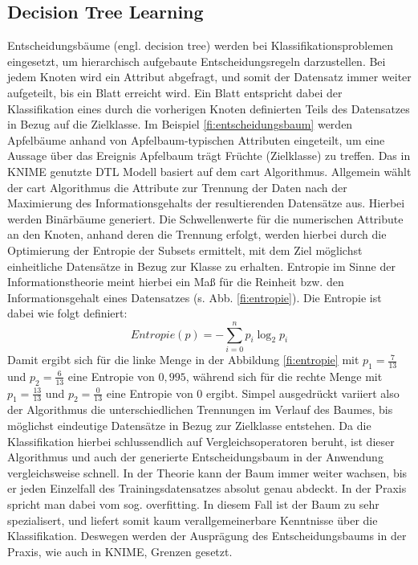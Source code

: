 \subsection{Decision Tree Learning}
\label{sec:dtl}
Entscheidungsbäume (engl. decision tree) werden bei Klassifikationsproblemen eingesetzt, um hierarchisch aufgebaute Entscheidungsregeln darzustellen. Bei jedem Knoten wird ein Attribut abgefragt, und somit der Datensatz immer weiter aufgeteilt, bis ein Blatt erreicht wird. Ein Blatt entspricht dabei der Klassifikation eines durch die vorherigen Knoten definierten Teils des Datensatzes in Bezug auf die Zielklasse. Im Beispiel \ref{fi:entscheidungsbaum} werden Apfelbäume anhand von Apfelbaum-typischen Attributen eingeteilt, um eine Aussage über das Ereignis \glqq Apfelbaum trägt Früchte\grqq{} (Zielklasse) zu treffen.\newline 
Das in \ac{KNIME} genutzte \ac{DTL} Modell basiert auf dem \ac{cart} Algorithmus. Allgemein wählt der \ac{cart} Algorithmus die Attribute zur Trennung der Daten nach der Maximierung des Informationsgehalts der resultierenden Datensätze aus. Hierbei werden Binärbäume generiert. Die Schwellenwerte für die numerischen Attribute an den Knoten, anhand deren die Trennung erfolgt, werden hierbei durch die Optimierung der Entropie der Subsets ermittelt, mit dem Ziel möglichst einheitliche Datensätze in Bezug zur Klasse zu erhalten. Entropie im Sinne der Informationstheorie meint hierbei ein Maß für die \glqq Reinheit\grqq{} bzw. den Informationsgehalt eines Datensatzes (s. Abb. \ref{fi:entropie}). Die Entropie ist dabei wie folgt definiert:
\[Entropie(p) = -\sum_{i=0}^n p_i {\log_2 p_i}\] 
Damit ergibt sich für die linke Menge in der Abbildung \ref{fi:entropie} mit $ p_1=\frac{7}{13}$ und $ p_2=\frac{6}{13}$ eine Entropie von $0,995$, während sich für die rechte Menge mit $ p_1=\frac{13}{13}$ und $ p_2=\frac{0}{13}$ eine Entropie von $0$ ergibt. Simpel ausgedrückt variiert also der Algorithmus die unterschiedlichen Trennungen im Verlauf des Baumes, bis möglichst eindeutige Datensätze in Bezug zur Zielklasse entstehen. Da die Klassifikation hierbei schlussendlich auf Vergleichsoperatoren beruht, ist dieser Algorithmus und auch der generierte Entscheidungsbaum in der Anwendung vergleichsweise schnell. In der Theorie kann der Baum immer weiter wachsen, bis er jeden Einzelfall des Trainingsdatensatzes absolut genau abdeckt. In der Praxis spricht man dabei vom sog. \glqq overfitting\grqq{}. In diesem Fall ist der Baum zu sehr spezialisert, und liefert somit kaum verallgemeinerbare Kenntnisse über die Klassifikation. Deswegen werden der Ausprägung des Entscheidungsbaums in der Praxis, wie auch in \ac{KNIME}, Grenzen gesetzt.
